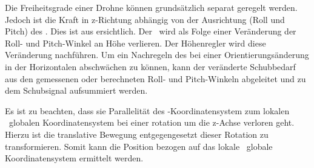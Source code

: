 Die Freiheitsgrade einer Drohne können grundsätzlich separat geregelt werden.
Jedoch ist die Kraft in z-Richtung abhängig von der Ausrichtung (Roll und Pitch) des \Quad[s]. Dies ist aus  ersichtlich. Der \Quad\ wird als Folge einer Veränderung der Roll- und Pitch-Winkel an Höhe verlieren. Der Höhenregler wird diese Veränderung nachführen.
Um ein Nachregeln des \Quad[s] bei einer Orientierungsänderung in der Horizontalen abschwächen zu können, kann der veränderte Schubbedarf aus den gemessenen oder berechneten Roll- und Pitch-Winkeln abgeleitet und zu dem Schubsignal aufsummiert werden.


Es ist zu beachten, dass sie Parallelität des \Quad-Koordinatensystem zum lokalen \bzw\ globalen Koordinatensystem bei einer rotation um die z-Achse verloren geht. Hierzu ist die translative Bewegung entgegengesetzt dieser Rotation zu transformieren. Somit kann die Position bezogen auf das lokale \bzw\ globale Koordinatensystem ermittelt werden.  %


